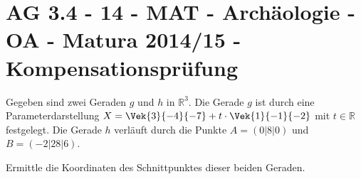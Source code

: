 \section{AG 3.4 - 14 - MAT - Archäologie - OA - Matura 2014/15 - Kompensationsprüfung}

\begin{beispiel}[AG 3.4]{1} %
				Gegeben sind zwei Geraden $g$ und $h$ in $\mathbb{R}^{3}$.
				Die Gerade $g$ ist durch eine Parameterdarstellung $X=\Vek{3}{-4}{-7}+t\cdot\Vek{1}{-1}{-2}$ mit $t\in\mathbb{R}$ festgelegt.
				Die Gerade $h$ verläuft durch die Punkte $A=(0|8|0)$ und $B=(-2|28|6)$.
				
				Ermittle die Koordinaten des Schnittpunktes dieser beiden Geraden.
				
\end{beispiel}